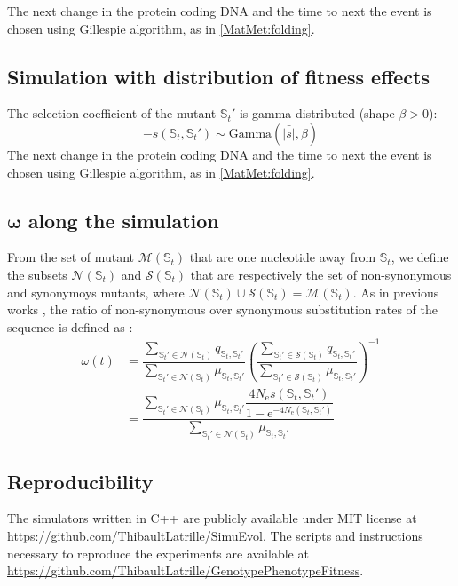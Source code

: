 \documentclass{article}
\newcommand{\e}{\mathrm{e}}
\newcommand{\Ne}{N_{\mathrm{e}}}
\newcommand{\dnds}{\omega}
\newcommand{\ci}{\mathbb{S}_{t}}
\newcommand{\cj}{\mathbb{S}_{t}'}
\newcommand{\itoj}{\ci, \cj}
\newcommand{\setNeighbors}{\mathcal{M}\left(\ci\right)}
\newcommand{\setNonSynNeighbors}{\mathcal{N}\left(\ci\right)}
\newcommand{\setSynNeighbors}{\mathcal{S}\left(\ci\right)}
\newcommand{\submatrix}{q}
\begin{document}
The next change in the protein coding DNA and the time to next the event is chosen using Gillespie algorithm, as in \ref{MatMet:folding}.

\subsection{Simulation with distribution of fitness effects}
The selection coefficient of the mutant $\cj$ is gamma distributed (shape $\beta > 0$):
\begin{equation}
- s \left( \ci,\cj\right) \sim \text{Gamma} \left( \bar{|s|}, \beta \right)
\end{equation}
The next change in the protein coding DNA and the time to next the event is chosen using Gillespie algorithm, as in \ref{MatMet:folding}.

\subsection{$\bm{\dnds}$ along the simulation}
From the set of mutant $\setNeighbors$ that are one nucleotide away from $\ci$, we define the subsets $\setNonSynNeighbors$ and $\setSynNeighbors$ that are respectively the set of non-synonymous and synonymoys mutants, where  $\setNonSynNeighbors \cup \setSynNeighbors = \setNeighbors$.
As in previous works \cite{Spielman2015a, DosReis2015, Jones2016}, the ratio of non-synonymous over synonymous substitution rates of the sequence is defined as :
\begin{align}
\dnds(t) &= \dfrac{\sum_{\cj \in \setNonSynNeighbors} \submatrix_{\itoj}}{\sum_{\cj \in \setNonSynNeighbors} \mu_{\itoj}} \left( \dfrac{\sum_{\cj \in \setSynNeighbors} \submatrix_{\itoj}}{\sum_{\cj \in \setSynNeighbors} \mu_{\itoj}} \right)^{-1}\\
 &= \dfrac{\sum_{\cj \in \setNonSynNeighbors} \mu_{\itoj} \dfrac{4 \Ne s \left( \ci,\cj\right)}{{1 - \e^{-4 \Ne \left( \ci,\cj\right)} }}}{\sum_{\cj \in \setNonSynNeighbors} \mu_{\itoj}} 
\end{align}
\subsection{Reproducibility}
The simulators written in C++ are publicly available under MIT license at \url{https://github.com/ThibaultLatrille/SimuEvol}.
The scripts and instructions necessary to reproduce the experiments are available at \url{https://github.com/ThibaultLatrille/GenotypePhenotypeFitness}.
\end{document}
